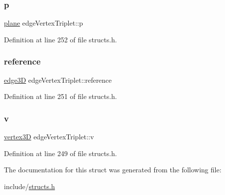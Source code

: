 \subsubsection{\texorpdfstring{p}{p}}
{\footnotesize\ttfamily \mbox{\hyperlink{structplane}{plane}} edge\+Vertex\+Triplet\+::p}



Definition at line 252 of file structs.\+h.

\mbox{\label{structedge_vertex_triplet_afe218b97c39b18b49d4c4e06e937a98f}} 
\subsubsection{\texorpdfstring{reference}{reference}}
{\footnotesize\ttfamily \mbox{\hyperlink{structedge3_d}{edge3D}} edge\+Vertex\+Triplet\+::reference}



Definition at line 251 of file structs.\+h.

\mbox{\label{structedge_vertex_triplet_aae5ca347902fd66a83bf45def3566692}} 
\subsubsection{\texorpdfstring{v}{v}}
{\footnotesize\ttfamily \mbox{\hyperlink{structvertex3_d}{vertex3D}} edge\+Vertex\+Triplet\+::v}



Definition at line 249 of file structs.\+h.



The documentation for this struct was generated from the following file\+:\begin{DoxyCompactItemize}
\item 
include/\mbox{\hyperlink{structs_8h}{structs.\+h}}\end{DoxyCompactItemize}
